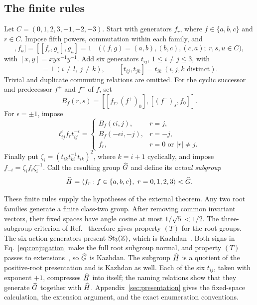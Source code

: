 \documentclass[11pt]{article}
\begin{document}
\subsection{The finite rules}
Let $C=(0,1,2,3,-1,-2,-3)$. Start with generators $f_r$, where
$f\in\{a,b,c\}$ and $r\in C$. Impose fifth powers, commutation within each family, and
\begin{equation}
 [[f_r,g_s],f_u]=[[f_r,g_s],g_u]=1
 \quad\bigl((f,g)=(a,b),(b,c),(c,a);\ r,s,u\in C\bigr),
 \label{eq:root-rel}
\end{equation}
with $[x,y]=xyx^{-1}y^{-1}$. Add six generators $t_{ij}$, $1\le i\ne j\le3$, with
\begin{equation}
 [t_{ij},t_{kl}]=1\ (i\ne l,\ j\ne k),
 \qquad [t_{ij},t_{jk}]=t_{ik}\ (i,j,k\text{ distinct}).
 \label{eq:steinberg}
\end{equation}
Trivial and duplicate commuting relations are omitted. For the cyclic successor and
predecessor $f^+$ and $f^-$ of $f$, set
\[
 B_f(r,s)=[[f_r,(f^+)_0],[(f^-)_s,f_0]].
\]
For $\epsilon=\pm1$, impose
\begin{equation}
 t_{ij}^{\epsilon}f_rt_{ij}^{-\epsilon}=
 \begin{cases}
 B_f(\epsilon i,j),&r=j,\\
 B_f(-\epsilon i,-j),&r=-j,\\
 f_r,&r=0\text{ or }|r|\ne j.
 \end{cases}
 \label{eq:conjugation}
\end{equation}
Finally put $\zeta_i=(t_{ik}t_{ki}^{-1}t_{ik})^2$, where $k=i+1$ cyclically, and impose
$f_{-i}=\zeta_i f_i\zeta_i^{-1}$. Call the resulting group $\widehat G$ and define its
\emph{actual subgroup}
\[
 \Hhat=\langle f_r:f\in\{a,b,c\},\ r=0,1,2,3\rangle<\Ghat.
\]

These finite rules supply the hypotheses of the external theorem. Any two root families generate
a finite class-two group. After removing common invariant vectors, their fixed spaces have
angle cosine at most $1/\sqrt5<1/2$. The three-subgroup criterion of Ref.~\cite{ejz}
therefore gives property $(T)$ for the root groups. The six action generators present
$\operatorname{St}_3(\mathbb Z)$, which is Kazhdan~\cite{ejz}. Both signs in
Eq.~\eqref{eq:conjugation} make the full root subgroup normal, and property $(T)$ passes to
extensions~\cite[Proposition~1.7.6]{bhv}, so $\widehat G$ is Kazhdan. The subgroup $\widehat H$ is a
quotient of the positive-root presentation and is Kazhdan as well. Each of the six $t_{ij}$,
taken with exponent $+1$, compresses $\widehat H$ into itself; the naming relations show that
they generate $\widehat G$ together with $\widehat H$.
Appendix~\ref{sec:presentation} gives the fixed-space calculation, the extension argument, and the
exact enumeration conventions.
\end{document}
